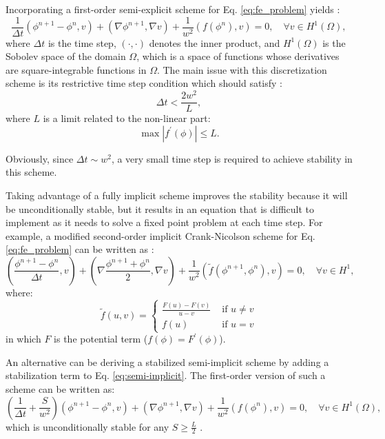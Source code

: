 Incorporating a first-order semi-explicit scheme for Eq. \ref{eq:fe_problem} yields \cite{Abboud2019}:
\begin{equation} \label{eq:semi-implicit}
\frac{1}{\Delta t}\left(\phi^{n+1}-\phi^{n}, v\right)+\left(\nabla \phi^{n+1}, \nabla v\right)+\frac{1}{w^{2}}\left(f\left(\phi^{n}\right), v\right)=0, \quad \forall v \in H^{1}(\Omega),
\end{equation}
where $\Delta t$ is the time step, $(\cdot,\cdot)$ denotes the inner product, and $H^{1}(\Omega)$ is the Sobolev space of the domain $\Omega$, which is a space of functions whose derivatives are square-integrable functions in $\Omega$. The main issue with this discretization scheme is its restrictive time step condition which should satisfy \cite{Shen2010}:
\begin{equation}
\Delta t < \frac{2w^2}{L},
\end{equation}
where $L$ is a limit related to the non-linear part:
\begin{equation}
\max \left|f^{\prime}(\phi)\right| \leq L.
\end{equation}

Obviously, since $\Delta t \sim w^2$, a very small time step is required to achieve stability in this scheme.

Taking advantage of a fully implicit scheme improves the stability because it will be unconditionally stable, but it results in an equation that is difficult to implement as it needs to solve a fixed point problem at each time step. For example, a modified second-order implicit Crank-Nicolson scheme for Eq. \ref{eq:fe_problem} can be written as \cite{Abboud2019,Elliott1989}:
\begin{equation}
\left(\frac{\phi^{n+1}-\phi^{n}}{\Delta t}, v\right)+\left(\nabla \frac{\phi^{n+1}+\phi^{n}}{2}, \nabla v\right)+\frac{1}{w^{2}}\left(\tilde{f}\left(\phi^{n+1}, \phi^{n}\right), v\right)=0, \quad \forall v \in H^{1},
\end{equation}
where:
\begin{equation}
\tilde{f}(u, v)=\left\{\begin{array}{ll}
\frac{F(u)-F(v)}{u-v} & \text { if } u \neq v \\
f(u) & \text { if } u=v
\end{array}\right.
\end{equation}
in which $F$ is the potential term ($f(\phi)=F^{\prime}(\phi)$).

An alternative can be deriving a stabilized semi-implicit scheme by adding a stabilization term to Eq. \ref{eq:semi-implicit}. The first-order version of such a scheme can be written as:
\begin{equation}
\left(\frac{1}{\Delta t}+\frac{S}{w^{2}}\right)\left(\phi^{n+1}-\phi^{n}, v\right)+\left(\nabla \phi^{n+1}, \nabla v\right)+\frac{1}{w^{2}}\left(f\left(\phi^{n}\right), v\right)=0, \quad \forall v \in H^{1}(\Omega),
\end{equation}
which is unconditionally stable for any $S \geq \frac{L}{2}$ \cite{Shen2010}.


